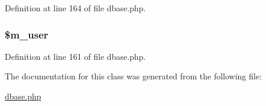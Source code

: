 Definition at line 164 of file dbase.\+php.

\hypertarget{class_c_dbase_abfe23707f464ce39565482d658291b25}{
\subsubsection[{\$m\+\_\+user}]{\setlength{\rightskip}{0pt plus 5cm}\$m\+\_\+user\hspace{0.3cm}{\ttfamily [private]}}}\label{class_c_dbase_abfe23707f464ce39565482d658291b25}


Definition at line 161 of file dbase.\+php.



The documentation for this class was generated from the following file\+:\begin{DoxyCompactItemize}
\item 
\hyperlink{dbase_8php}{dbase.\+php}\end{DoxyCompactItemize}
